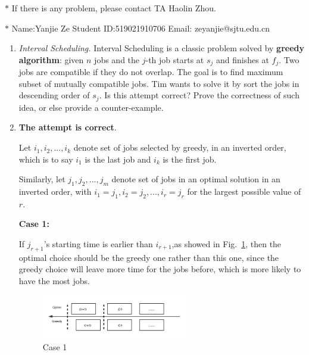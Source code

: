\documentclass[12pt,a4paper]{article}
\makeatletter
\newtheorem*{solution}{Solution}
\theoremstyle{definition}
\renewenvironment{solution}[1][Solution] {\par\pushQED{\qed}\normalfont\topsep6\p@\@plus6\p@\relax\trivlist\item[\hskip\labelsep\bfseries#1\@addpunct{.}]\ignorespaces}{\popQED\endtrivlist\@endpefalse} \makeatother
\makeatother
\begin{document}
\noindent

\noindent{}


\begin{center}
\footnotesize{\color{red}$*$ If there is any problem, please contact TA Haolin Zhou.}\par
\footnotesize{\color{blue}$*$ Name:Yanjie Ze  \quad Student ID:519021910706 \quad Email: zeyanjie@sjtu.edu.cn}
\end{center}

\begin{enumerate}
	\item \textit{Interval Scheduling.} Interval Scheduling is a classic problem solved by \textbf{greedy algorithm}: given $n$ jobs and the $j$-th job starts at $s_j$ and finishes at $f_j$. Two jobs are compatible if they do not overlap. The goal is to find maximum subset of mutually compatible jobs. Tim wants to solve it by sort the jobs in descending order of $s_j$. Is this attempt correct? Prove the correctness of such idea, or else provide a counter-example.

\begin{solution}

\textbf{The attempt is correct}.

Let $i_1,i_2, ...,i_k$ denote set of jobs selected by greedy, in an inverted order, which is to say $i_1$ is the last job and $i_k$ is the first job.

Similarly, let $j_1, j_2,...,j_m$ denote set of jobs in an optimal solution in an inverted order, with $i_1 = j_1, i_2=j_2,...,i_r=j_r$ for the largest possible value of $r$.

\textbf{Case 1:}

If $j_{r+1}$'s starting time is earlier than $i_{r+1}$,as showed in Fig.~\ref{case1}, then the optimal  choice should be the greedy one rather than this one, since the greedy choice will leave more time for the jobs before, which is more likely to have the most jobs. 

\begin{figure}[htbp]
    \centering
    \includegraphics[width=0.6\textwidth]{case1.png}
    \caption{Case 1}\label{case1}
\end{figure}


\end{solution}
\end{enumerate}
\end{document}
